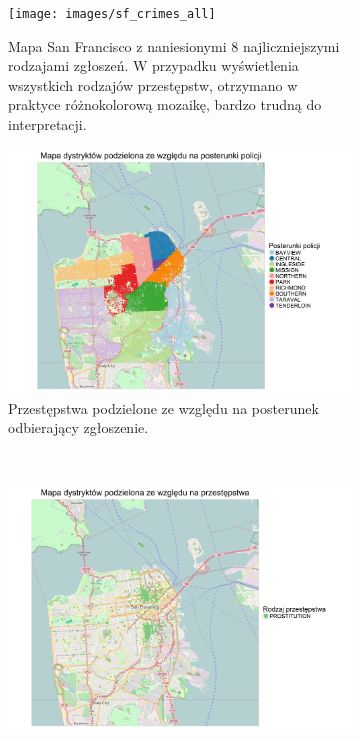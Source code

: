 \documentclass[11pt]{article} %
\begin{document}
\begin{figure}[!h]
\centering
   \begin{subfigure}{0.48\linewidth}
   \centering
   \texttt{[image: images/sf\_crimes\_all]}
   \caption{Mapa San Francisco z naniesionymi 8 najliczniejszymi rodzajami zgłoszeń. W przypadku wyświetlenia wszystkich rodzajów przestępstw, otrzymano w praktyce różnokolorową mozaikę, bardzo trudną do interpretacji.}
   \label{fig:sf_top8} 
\end{subfigure}
\hfill
\begin{subfigure}{0.48\linewidth}
   \centering
   \includegraphics[width=\linewidth]{images/sf_districts}
   \caption{Przestępstwa podzielone ze względu na posterunek odbierający zgłoszenie.} 
   \label{fig:sf_districts}
\end{subfigure}
\\[\baselineskip]
   \begin{subfigure}{0.48\linewidth}
   \centering
   \includegraphics[width=\linewidth]{images/sf_crimes_3}

\end{subfigure}
\end{figure}
\end{document}
